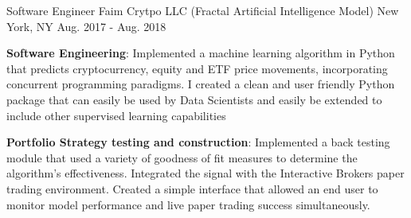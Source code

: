 \begin{cventries}
   \cventry 
        {Software Engineer}
        {Faim Crytpo LLC (Fractal Artificial Intelligence Model)}
        {New York, NY}
        {Aug. 2017 - Aug. 2018}
        {
          \begin{cvitems}
              \item{\textbf{Software Engineering}: Implemented a machine learning algorithm in Python that predicts cryptocurrency, equity and ETF price movements, incorporating concurrent programming paradigms. I created a clean and user friendly Python package that can easily be used by Data Scientists and easily be extended to include other supervised learning capabilities
              }
              \item{\textbf{Portfolio Strategy testing and construction}: Implemented a back testing module that used a variety of goodness of fit measures to determine the algorithm's effectiveness. Integrated the signal with the Interactive Brokers paper trading environment. Created a simple interface that allowed an end user to monitor model performance and live paper trading success simultaneously.
              }
          \end{cvitems}
        }
\end{cventries}
